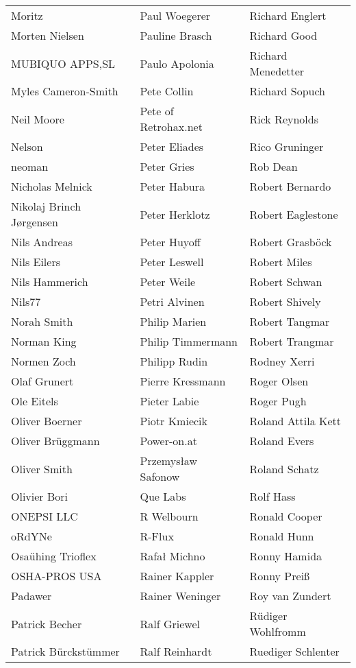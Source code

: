 \begin{tabular}{p{4.5cm}p{4.5cm}p{4.5cm}}
Moritz & Paul Woegerer & Richard Englert \\
Morten Nielsen & Pauline Brasch & Richard Good \\
MUBIQUO APPS,SL & Paulo Apolonia & Richard Menedetter \\
Myles Cameron-Smith & Pete Collin & Richard Sopuch \\
Neil Moore & Pete of Retrohax.net & Rick Reynolds \\
Nelson & Peter Eliades & Rico Gruninger \\
neoman & Peter Gries & Rob Dean \\
Nicholas Melnick & Peter Habura & Robert Bernardo \\
Nikolaj Brinch Jørgensen & Peter Herklotz & Robert Eaglestone \\
Nils Andreas & Peter Huyoff & Robert Grasböck \\
Nils Eilers & Peter Leswell & Robert Miles \\
Nils Hammerich & Peter Weile & Robert Schwan \\
Nils77 & Petri Alvinen & Robert Shively \\
Norah Smith & Philip Marien & Robert Tangmar \\
Norman King & Philip Timmermann & Robert Trangmar \\
Normen Zoch & Philipp Rudin & Rodney Xerri \\
Olaf Grunert & Pierre Kressmann & Roger Olsen \\
Ole Eitels & Pieter Labie & Roger Pugh \\
Oliver Boerner & Piotr Kmiecik & Roland Attila Kett \\
Oliver Brüggmann & Power-on.at & Roland Evers \\
Oliver Smith & Przemysław Safonow & Roland Schatz \\
Olivier Bori & Que Labs & Rolf Hass \\
ONEPSI LLC & R Welbourn & Ronald Cooper \\
oRdYNe & R-Flux & Ronald Hunn \\
Osaühing Trioflex & Rafał Michno & Ronny Hamida \\
OSHA-PROS USA & Rainer Kappler & Ronny Preiß \\
Padawer & Rainer Weninger & Roy van Zundert \\
Patrick Becher & Ralf Griewel & Rüdiger Wohlfromm \\
Patrick Bürckstümmer & Ralf Reinhardt & Ruediger Schlenter \\

\end{tabular}
